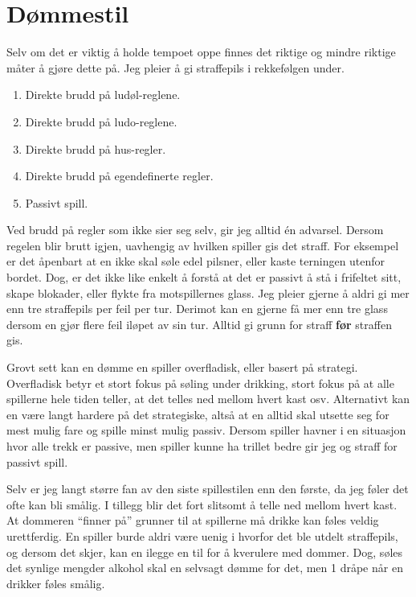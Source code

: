 \documentclass[10pt,a4paper,norsk,openany]{book}
\begin{document}
%

\section{Dømmestil}

Selv om det er viktig å holde tempoet oppe finnes det riktige og mindre riktige
måter å gjøre dette på. Jeg pleier å gi straffepils i rekkefølgen under.

\begin{enumerate}
  \item Direkte brudd på ludøl-reglene.
  \item Direkte brudd på ludo-reglene.
  \item Direkte brudd på hus-regler.
  \item Direkte brudd på egendefinerte regler.
  \item Passivt spill.
\end{enumerate}

Ved brudd på regler som ikke sier seg selv, gir jeg alltid én advarsel. Dersom
regelen blir brutt igjen, uavhengig av hvilken spiller gis det straff. For
eksempel er det åpenbart at en ikke skal søle edel pilsner, eller kaste
terningen utenfor bordet. Dog, er det ikke like enkelt å forstå at det er
passivt å stå i frifeltet sitt, skape blokader, eller flykte fra motspillernes
glass. Jeg pleier gjerne å aldri gi mer enn tre straffepils per feil per tur.
Derimot kan en gjerne få mer enn tre glass dersom en gjør flere feil iløpet av
sin tur. Alltid gi grunn for straff \textbf{før} straffen gis.

Grovt sett kan en dømme en spiller overfladisk, eller basert på strategi.
Overfladisk betyr et stort fokus på søling under drikking, stort fokus på at
alle spillerne hele tiden teller, at det telles ned mellom hvert kast osv.
Alternativt kan en være langt hardere på det strategiske, altså at en alltid
skal utsette seg for mest mulig fare og spille minst mulig passiv. Dersom spiller
havner i en situasjon hvor alle trekk er passive, men spiller kunne ha trillet
bedre gir jeg og straff for passivt spill.

Selv er jeg langt større fan av den siste spillestilen enn den første, da jeg
føler det ofte kan bli smålig. I tillegg blir det fort slitsomt å telle ned
mellom hvert kast. At dommeren ``finner på'' grunner til at spillerne må drikke
kan føles veldig urettferdig. En spiller burde aldri være uenig i hvorfor det
ble utdelt straffepils, og dersom det skjer, kan en ilegge en til for å
kverulere med dommer. Dog, søles det synlige mengder alkohol skal en selvsagt
dømme for det, men 1 dråpe når en drikker føles smålig. 
\end{document}
